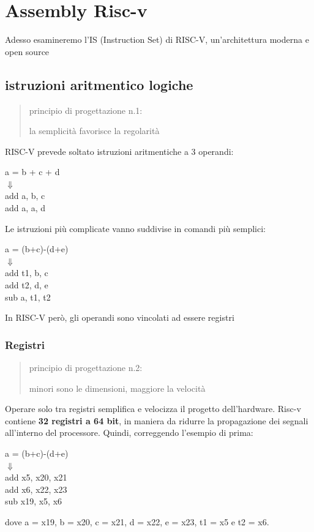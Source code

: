 \documentclass[12pt, a4paper]{article}
\begin{document}
\section{Assembly Risc-v}
Adesso esamineremo l'IS (Instruction Set) di RISC-V, un'architettura moderna e open source

\subsection{istruzioni aritmentico logiche}
\begin{quote}
  \center principio di progettazione n.1: 

  la semplicità favorisce la regolarità
\end{quote}

RISC-V prevede soltato istruzioni aritmentiche a 3 operandi:
\begin{center}
  a = b + c + d\\
  $\Downarrow$\\
  add a, b, c\\
  add a, a, d\\
\end{center}

Le istruzioni più complicate vanno suddivise in comandi più semplici:
\begin{center}
  a = (b+c)-(d+e)\\
  $\Downarrow$\\
  add t1, b, c \\
  add t2, d, e \\
  sub a, t1, t2\\
\end{center}  
In RISC-V però, gli operandi sono vincolati ad essere registri

\subsubsection{Registri}
\begin{quote}
  \center principio di progettazione n.2:
  
  minori sono le dimensioni, maggiore la velocità
\end{quote}
Operare solo tra registri semplifica e velocizza il progetto dell'hardware. 
Risc-v contiene \textbf{32 registri a 64 bit}, in maniera da ridurre la propagazione dei segnali 
all'interno del processore. Quindi, correggendo l'esempio di prima:
\begin{center}
  a = (b+c)-(d+e)\\
  $\Downarrow$\\
  add x5, x20, x21 \\
  add x6, x22, x23\\
  sub x19, x5, x6\\
\end{center} 
dove a = x19, b = x20, c = x21, d = x22, e = x23, t1 = x5 e t2 = x6.
\end{document}
